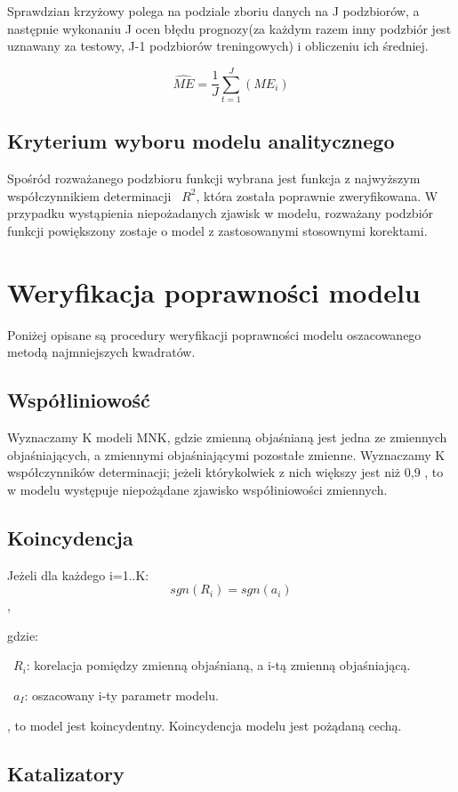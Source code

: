 \documentclass{article}
\begin{document}
Sprawdzian krzyżowy polega na podziale zboriu danych na J podzbiorów, a następnie wykonaniu J ocen błędu prognozy(za każdym razem inny podzbiór jest uznawany za testowy, J-1 podzbiorów treningowych) i obliczeniu ich średniej.

\[\hat{ME}= \frac{1}{J} \sum_{t=1}^{J} ( ME_i ) \]

\subsection{Kryterium wyboru modelu analitycznego}
Spośród rozważanego podzbioru funkcji wybrana jest funkcja z najwyższym współczynnikiem determinacji ~$R^2$, która została poprawnie zweryfikowana. W przypadku wystąpienia niepożadanych zjawisk w modelu, rozważany podzbiór funkcji powiększony zostaje o model z zastosowanymi stosownymi korektami.


\newpage
\section{Weryfikacja poprawności modelu}
Poniżej opisane są procedury weryfikacji poprawności modelu oszacowanego metodą najmniejszych kwadratów.

\subsection{Współliniowość}
Wyznaczamy K modeli MNK, gdzie zmienną objaśnianą jest jedna ze zmiennych objaśniających, a zmiennymi objaśniającymi pozostałe zmienne. Wyznaczamy K współczynników determinacji; jeżeli którykolwiek z nich większy jest niż 0,9 , to w modelu występuje niepożądane zjawisko współiniowości zmiennych.

\subsection{Koincydencja}
Jeżeli dla każdego i=1..K:
\[sgn(R_i) = sgn(a_i)\],

gdzie:

~$R_i$: korelacja pomiędzy zmienną objaśnianą, a i-tą zmienną objaśniającą.

~$a_I$: oszacowany i-ty parametr modelu.

, to model jest koincydentny. Koincydencja modelu jest pożądaną cechą.

\subsection{Katalizatory}
\end{document}
